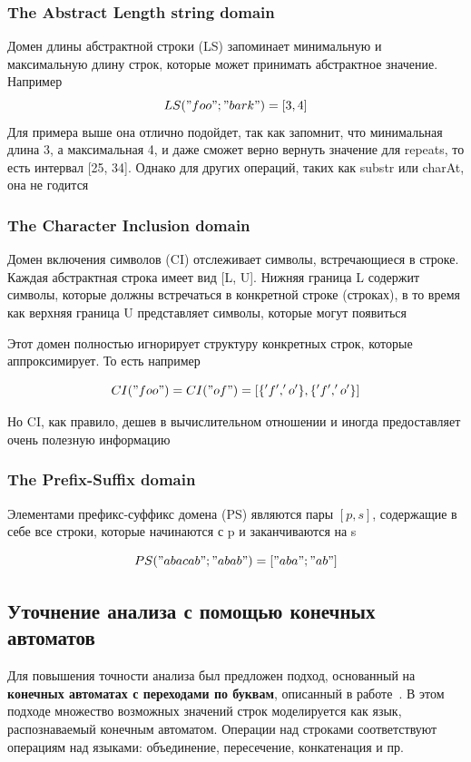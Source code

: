 \subsubsection*{The Abstract Length string domain}
Домен длины абстрактной строки (LS) запоминает минимальную и максимальную длину строк, которые может принимать абстрактное значение. Например
$$LS("foo"; "bark") = [3, 4] $$
Для примера выше она отлично подойдет, так как запомнит, что минимальная длина 3, а максимальная 4, и даже сможет верно вернуть значение для repeats, то есть интервал [25, 34]. Однако для других операций, таких как substr или charAt, она не годится

\subsubsection*{The Character Inclusion domain}
Домен включения символов (CI) отслеживает символы, встречающиеся в строке. Каждая абстрактная строка имеет вид [L, U]. Нижняя граница L содержит символы, которые должны встречаться в конкретной строке (строках), в то время как верхняя граница U представляет символы, которые могут появиться

Этот домен полностью игнорирует структуру конкретных строк, которые аппроксимирует. То есть например 

$$CI("foo") = CI("of") = [\{'f', 'o'\}, \{'f', 'o'\}]$$

Но CI, как правило, дешев в вычислительном отношении и иногда предоставляет очень полезную информацию

\subsubsection*{The Prefix-Suffix domain}
Элементами префикс-суффикс домена (PS) являются пары $[p, s]$, содержащие в себе все строки, которые начинаются с p и заканчиваются на s

\[PS("abacab"; "abab") = ["aba"; "ab"]\]



\newpage
\subsection{Уточнение анализа с помощью конечных автоматов}

Для повышения точности анализа был предложен подход, основанный на \textbf{конечных автоматах с переходами по буквам}, описанный в работе~\cite{apinis2020symbolic}. В этом подходе множество возможных значений строк моделируется как язык, распознаваемый конечным автоматом. Операции над строками соответствуют операциям над языками: объединение, пересечение, конкатенация и пр.

